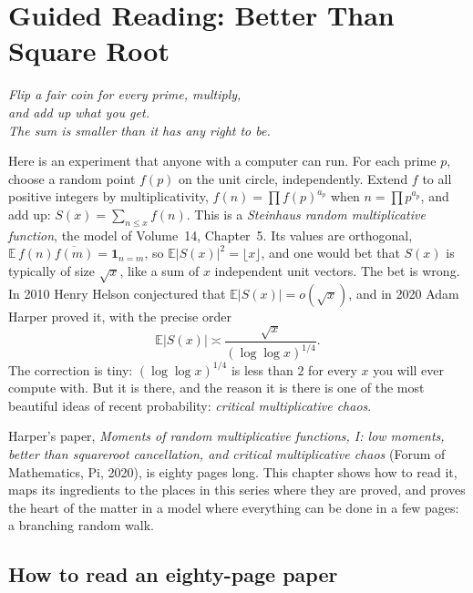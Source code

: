 \chapter{Guided Reading: Better Than Square Root}
\label{ch:chaos}

\begin{center}\itshape
Flip a fair coin for every prime, multiply,\\
and add up what you get.\\
The sum is smaller than it has any right to be.
\end{center}

Here is an experiment that anyone with a computer can run. For each prime $p$, choose a random point $f(p)$ on the unit circle, independently. Extend $f$ to all positive integers by multiplicativity,
$f(n)=\prod f(p)^{a_p}$ when $n=\prod p^{a_p}$, and add up: $S(x)=\sum_{n\le x}f(n)$. This is a \emph{Steinhaus random multiplicative function}, the model of Volume~14, Chapter~5. Its values are
orthogonal, $\mathbb E\,f(n)\overline{f(m)}=\mathbf 1_{n=m}$, so $\mathbb E|S(x)|^2=\lfloor x\rfloor$, and one would bet that $S(x)$ is typically of size $\sqrt x$, like a sum of $x$ independent
unit vectors. The bet is wrong. In 2010 Henry Helson conjectured that $\mathbb E|S(x)|=o(\sqrt x)$, and in 2020 Adam Harper proved it, with the precise order
\[
\mathbb E|S(x)|\asymp\frac{\sqrt x}{(\log\log x)^{1/4}}.
\]
The correction is tiny: $(\log\log x)^{1/4}$ is less than $2$ for every $x$ you will ever compute with. But it is there, and the reason it is there is one of the most beautiful ideas of recent probability: \emph{critical multiplicative chaos}.

Harper's paper, \emph{Moments of random multiplicative functions, I: low moments, better than squareroot cancellation, and critical multiplicative chaos} (Forum of Mathematics, Pi, 2020), is eighty pages long. This chapter shows how to read it, maps its ingredients to the places in this series where they are proved, and proves the heart of the matter in a model where everything can be done in a few pages: a branching random walk.

\section{How to read an eighty-page paper}

